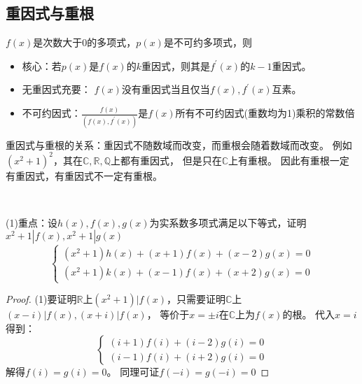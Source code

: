 \subsection{重因式与重根}

\begin{theorem}[重因式性质汇总]
  $f(x)$是次数大于$0$的多项式，$p(x)$是不可约多项式，则
  \begin{itemize}
  \item 核心：若$p(x)$是$f(x)$的$k$重因式，则其是$f^{\prime}(x)$的$k - 1$重因式。
  \item 无重因式充要： $f(x)$没有重因式当且仅当$f(x),f^{\prime}(x)$互素。
  \item 不可约因式：$\frac{f(x)}{(f(x),f^{\prime}(x))}$是$f(x)$所有不可约因式(重数均为1)乘积的常数倍
  \end{itemize}
\end{theorem}

\begin{note}
  重因式与重根的关系：重因式不随数域而改变，而重根会随着数域而改变。
  例如$(x^2 + 1)^2$，其在$\mathbb{C},\mathbb{R},\mathbb{Q}$上都有重因式，
  但是只在$\mathbb{C}$上有重根。
  因此有重根一定有重因式，有重因式不一定有重根。
\end{note}

~

\begin{exercise}[用根判断因式]
  (1)重点：设$h(x),f(x),g(x)$为实系数多项式满足以下等式，证明$x^2 + 1 |f(x), x^2 + 1|g(x)$
  \begin{equation*}
    \begin{cases}
      (x^2 + 1)h(x) + (x+1)f(x) + (x-2)g(x) = 0\\
      (x^2 + 1)k(x) + (x-1)f(x) + (x+2)g(x) = 0
    \end{cases}
  \end{equation*}
\end{exercise}

\begin{proof}
  (1)要证明$\mathbb{R}$上$(x^2 + 1)|f(x)$，只需要证明$\mathbb{C}$上$(x - i)|f(x), (x + i)|f(x)$，
  等价于$x = \pm i$在$\mathbb{C}$上为$f(x)$的根。
  代入$x = i$得到：
  \begin{equation*}
    \begin{cases}
      (i+1)f(i) + (i-2)g(i) = 0\\
      (i-1)f(i) + (i+2)g(i) = 0
    \end{cases}
  \end{equation*}
  解得$f(i) = g(i) = 0$。
  同理可证$f(-i) = g(-i) = 0$
\end{proof}

